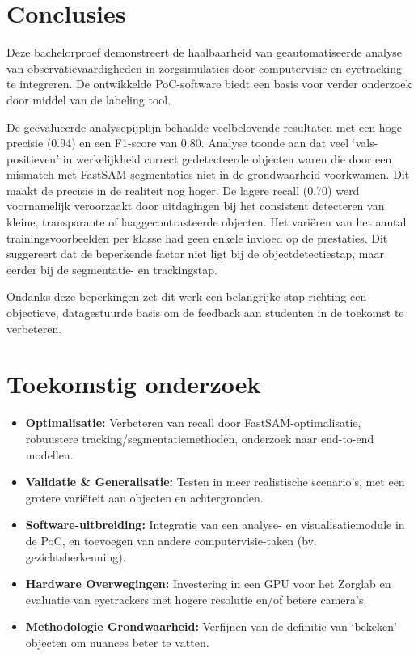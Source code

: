 \documentclass[a0,portrait]{hogent-poster}
\begin{document}
\begin{multicols}{2}
\section{Conclusies}
Deze bachelorproef demonstreert de haalbaarheid van geautomatiseerde analyse van observatievaardigheden in zorgsimulaties door computervisie en eyetracking te integreren. 
De ontwikkelde PoC-software biedt een basis voor verder onderzoek door middel van de labeling tool.

De geëvalueerde analysepijplijn behaalde veelbelovende resultaten met een hoge precisie (0.94) en een F1-score van 0.80. 
Analyse toonde aan dat veel `vals-positieven' in werkelijkheid correct gedetecteerde objecten waren die door een mismatch met FastSAM-segmentaties niet in de grondwaarheid voorkwamen.
Dit maakt de precisie in de realiteit nog hoger.
De lagere recall (0.70) werd voornamelijk veroorzaakt door uitdagingen bij het consistent detecteren van kleine, transparante of laaggecontrasteerde objecten.
Het variëren van het aantal trainingsvoorbeelden per klasse had geen enkele invloed op de prestaties. 
Dit suggereert dat de beperkende factor niet ligt bij de objectdetectiestap, maar eerder bij de segmentatie- en trackingstap.

Ondanks deze beperkingen zet dit werk een belangrijke stap richting een objectieve, datagestuurde basis om de feedback aan studenten in de toekomst te verbeteren.

\section{Toekomstig onderzoek}
\begin{itemize}
  \item \textbf{Optimalisatie:} Verbeteren van recall door FastSAM-optimalisatie, robuustere tracking/segmentatiemethoden, onderzoek naar end-to-end modellen.
  \item \textbf{Validatie \& Generalisatie:} Testen in meer realistische scenario's, met een grotere variëteit aan objecten en achtergronden.
  \item \textbf{Software-uitbreiding:} Integratie van een analyse- en visualisatiemodule in de PoC, en toevoegen van andere computervisie-taken (bv. gezichtsherkenning).
  \item \textbf{Hardware Overwegingen:} Investering in een GPU voor het Zorglab en evaluatie van eyetrackers met hogere resolutie en/of betere camera's.
  \item \textbf{Methodologie Grondwaarheid:} Verfijnen van de definitie van `bekeken' objecten om nuances beter te vatten.
\end{itemize}

\end{multicols}
\end{document}
